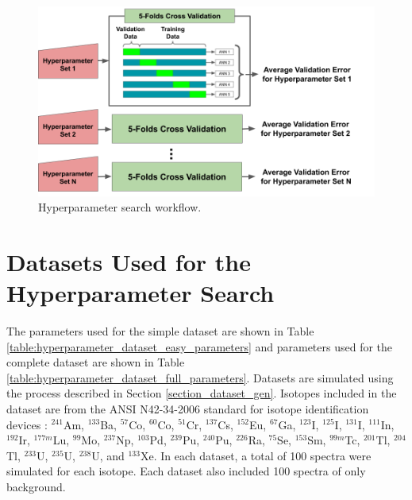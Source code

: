 \begin{figure}[H]
	\centering
	\includegraphics[trim=0 0 40 0,clip,width=1.0\linewidth]{images/hyperparameter_search_workflow}
	\caption{Hyperparameter search workflow.}
	\label{fig:hyperparameter_search_workflow}
\end{figure}


\section{Datasets Used for the Hyperparameter Search} \label{datasets_used_hyperparam_search}

The parameters used for the simple dataset are shown in Table \ref{table:hyperparameter_dataset_easy_parameters} and parameters used for the complete dataset are shown in Table \ref{table:hyperparameter_dataset_full_parameters}. Datasets are simulated using the process described in Section \ref{section_dataset_gen}. Isotopes included in the dataset are from the  ANSI N42-34-2006 standard for isotope identification devices \cite{ANSI}: $^{241}$Am, $^{133}$Ba, $^{57}$Co, $^{60}$Co, $^{51}$Cr, $^{137}$Cs, $^{152}$Eu, $^{67}$Ga, $^{123}$I, $^{125}$I, $^{131}$I, $^{111}$In, $^{192}$Ir, $^{177m}$Lu, $^{99}$Mo, $^{237}$Np, $^{103}$Pd, $^{239}$Pu, $^{240}$Pu, $^{226}$Ra, $^{75}$Se, $^{153}$Sm, $^{99m}$Tc, $^{201}$Tl, $^{204}$Tl, $^{233}$U, $^{235}$U, $^{238}$U, and $^{133}$Xe. In each dataset, a total of 100 spectra were simulated for each isotope. Each dataset also included 100 spectra of only background.

